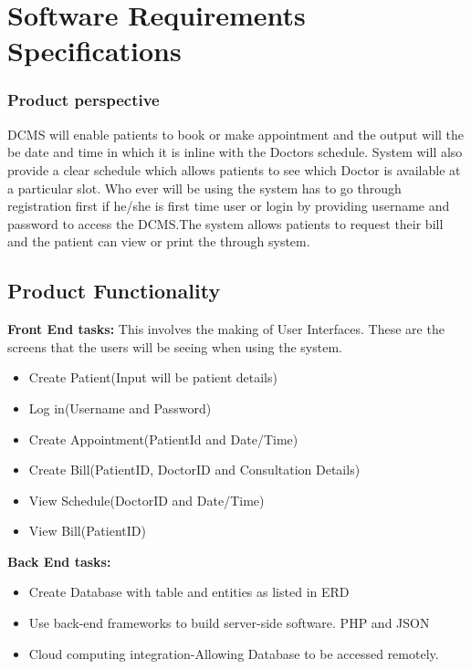 \documentclass[11 pt]{article}
\begin{document}
\section{Software Requirements Specifications}

\subsubsection{Product perspective}
DCMS will enable patients to book or make appointment and the output will the be date and time in which it is inline with the Doctors schedule. System will
also provide a clear schedule which allows patients to see
which Doctor is available at a particular slot. Who ever
will be using the system has to go through registration
first if he/she is first time user or login by providing
username and password to access the DCMS.The system allows patients to request their bill and the patient can view or print the through system.
\subsection{Product Functionality}
\textbf{Front End tasks:}
This involves the making of User Interfaces. These are the screens that the users will be seeing when using the system.
\begin{itemize}
\item
Create Patient(Input will be patient details)
\item
Log in(Username and Password)
\item
Create Appointment(PatientId and Date/Time)
\item
Create Bill(PatientID, DoctorID and Consultation Details)
\item
View Schedule(DoctorID and Date/Time)
\item
View Bill(PatientID)
\end{itemize}
\textbf{Back End tasks:}
\begin{itemize}
\item
Create Database with table and entities as listed in ERD
\item
Use back-end frameworks to build server-side software. PHP and JSON
\item
Cloud computing integration-Allowing Database to be accessed remotely.
\end{itemize}
\end{document}
